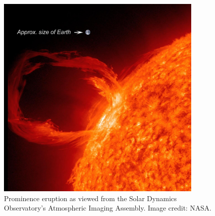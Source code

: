 \begin{figure}[!h]
    \begin{center}
	    \includegraphics[width=100mm]{Images/ProminenceEruption.png}
    \end{center}
    \caption[Prominence Eruption]{
        Prominence eruption as viewed from the Solar Dynamics Observatory's Atmospheric Imaging Assembly. Image credit:
        NASA. 
    }
    \label{fig:prominenceeruption}
\end{figure}

